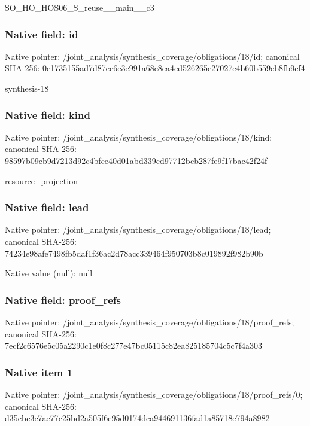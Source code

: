 \documentclass[10pt,a4paper]{article}
\begin{document}
\begingroup\raggedright\sloppy SO\_\allowbreak{}HO\_\allowbreak{}HOS06\_\allowbreak{}S\_\allowbreak{}reuse\_\allowbreak{}\_\allowbreak{}main\_\allowbreak{}\_\allowbreak{}c3\par\endgroup

\subsubsection{Native field: id}
Native pointer: /joint\_\allowbreak{}analysis/synthesis\_\allowbreak{}coverage/obligations/18/id; canonical SHA-256: 0e1735155ad7d87ec6c3e991a68c8ca4cd526265e27027c4b60b559eb8fb9cf4

\begingroup\raggedright\sloppy synthesis-18\par\endgroup

\subsubsection{Native field: kind}
Native pointer: /joint\_\allowbreak{}analysis/synthesis\_\allowbreak{}coverage/obligations/18/kind; canonical SHA-256: 98597b09cb9d7213d92c4bfee40d01abd339cd97712bcb287fe9f17bac42f24f

\begingroup\raggedright\sloppy resource\_\allowbreak{}projection\par\endgroup

\subsubsection{Native field: lead}
Native pointer: /joint\_\allowbreak{}analysis/synthesis\_\allowbreak{}coverage/obligations/18/lead; canonical SHA-256: 74234e98afe7498fb5daf1f36ac2d78acc339464f950703b8c019892f982b90b

Native value (null): null

\subsubsection{Native field: proof\_\allowbreak{}refs}
Native pointer: /joint\_\allowbreak{}analysis/synthesis\_\allowbreak{}coverage/obligations/18/proof\_\allowbreak{}refs; canonical SHA-256: 7ecf2c6576e5c05a2290c1e0f8c277e47bc05115c82ea825185704c5c7f4a303

\subsubsection{Native item 1}
Native pointer: /joint\_\allowbreak{}analysis/synthesis\_\allowbreak{}coverage/obligations/18/proof\_\allowbreak{}refs/0; canonical SHA-256: d35cbc3c7ae77c25bd2a505f6e95d0174dca944691136fad1a85718c794a8982
\end{document}
